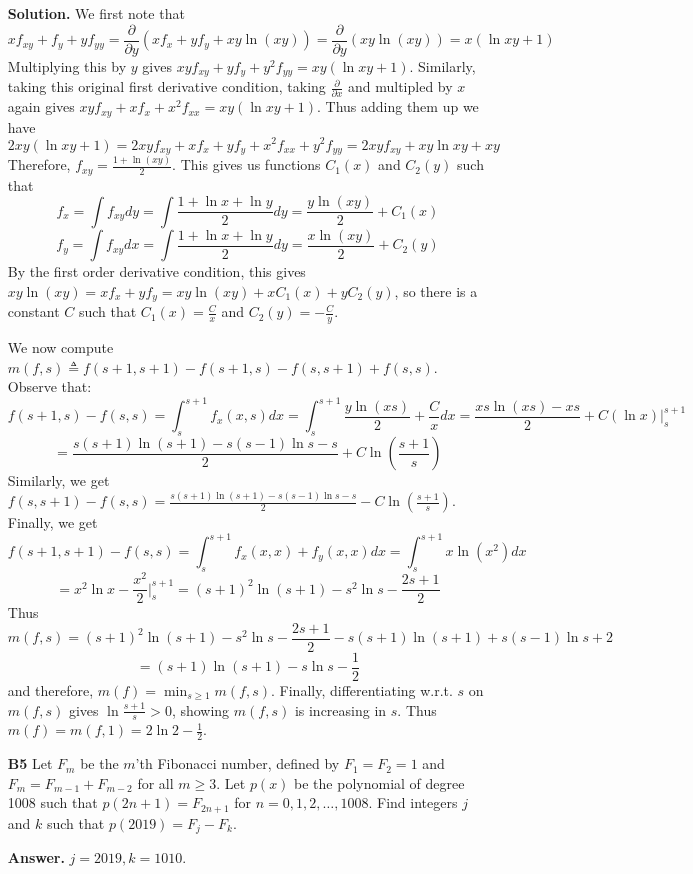 \documentclass[11pt,a4paper]{article}
\newcommand{\<}{\langle}
\renewcommand{\>}{\rangle}
\begin{document}
\begin{enumerate}
	\textbf{Solution.} 
	We first note that 
	\[
	xf_{xy} + f_y + yf_{yy} = \frac{\partial}{\partial y}(xf_x + yf_y + xy\ln (xy))
	=\frac{\partial}{\partial y}(xy\ln (xy))
	=x(\ln xy + 1)
	\]
	Multiplying this by $y$ gives $xyf_{xy} + yf_y + y^2f_{yy} = xy(\ln xy + 1)$. 
	Similarly, taking this original first derivative condition, 
	taking $\frac{\partial}{\partial x}$ and multipled by $x$ again gives 
	$xyf_{xy} + xf_x + x^2f_{xx} = xy(\ln xy + 1)$. 
	Thus adding them up we have 
	\[
	2xy(\ln xy + 1) = 2xyf_{xy} + xf_x + yf_y + x^2f_{xx} + y^2f_{yy} 
	=2xyf_{xy} + xy\ln xy + xy
	\]
	Therefore, $f_{xy} = \frac{1 + \ln (xy)}{2}$. 
	This gives us functions $C_1(x)$ and $C_2(y)$ such that 
	\[
	f_x = \int f_{xy} dy = \int \frac{1 + \ln x + \ln y}{2}dy = \frac{y\ln(xy)}{2} + C_1(x)
	\]\[
	f_y =  \int f_{xy} dx = \int \frac{1 + \ln x + \ln y}{2}dy = \frac{x\ln(xy)}{2} + C_2(y)
	\]
	By the first order derivative condition, this gives $xy\ln (xy)=xf_x + yf_y  = xy\ln(xy) + xC_1(x) + yC_2(y)$, 
	so there is a constant $C$ such that $C_1(x)=\frac{C}{x}$ and $C_2(y)=-\frac{C}{y}$. 
	
	We now compute $m(f, s)\triangleq f(s+1, s+1) - f(s+1, s) - f(s, s+1) + f(s, s)$. 
	Observe that: 
	\[
	f(s+1, s) - f(s, s) = \int_s^{s+1} f_x(x, s)dx
	=\int_s^{s+1}\frac{y\ln(xs)}{2} + \frac{C}{x}dx
	=\frac{xs\ln(xs) - xs}{2} + C(\ln x)|_s^{s+1}
	\]\[
	=\frac{s(s+1)\ln(s+1) - s(s-1)\ln s - s}{2} + C\ln(\frac{s + 1}{s})
	\]
	Similarly, we get $f(s, s + 1) - f(s, s) = \frac{s(s+1)\ln(s+1) - s(s-1)\ln s - s}{2} - C\ln(\frac{s + 1}{s})$. 
	Finally, we get 
	\[
	f(s + 1, s + 1) - f(s, s) 
	= \int_s^{s + 1} f_x(x, x) + f_y(x, x) dx
	= \int_s^{s+1} x\ln(x^2) dx 
	\]\[
	= x^2\ln x - \frac{x^2}{2}|_s^{s+1}
	=(s+1)^2\ln(s+1) - s^2\ln s - \frac{2s + 1}{2}
	\]
	Thus 
	\[
	m(f, s) = (s+1)^2\ln(s+1) - s^2\ln s - \frac{2s + 1}{2} - s(s+1)\ln(s+1) + s(s-1)\ln s + 2
	\]\[
	= (s+1)\ln (s+1) - s\ln s - \frac 12
	\]
	and therefore, $m(f) = \min_{s\ge 1} m(f, s)$. 
	Finally, differentiating w.r.t. $s$ on $m(f, s)$ gives $\ln\frac{s+1}{s} > 0$, 
	showing $m(f, s)$ is increasing in $s$. 
	Thus $m(f) = m(f, 1) = 2\ln 2 - \frac 12$. 
	
	\item [\textbf{B5}] Let $F_m$ be the $m$'th Fibonacci number, defined by $F_1=F_2=1$ and $F_m = F_{m-1}+F_{m-2}$ for all $m \geq 3$. Let $p(x)$ be the polynomial of degree 1008 such that $p(2n+1)=F_{2n+1}$ for $n=0,1,2,\ldots,1008$. Find integers $j$ and $k$ such that $p(2019) = F_j - F_k$.
	
	\textbf{Answer.} $j=2019, k=1010$. 
	

\end{enumerate}
\end{document}

